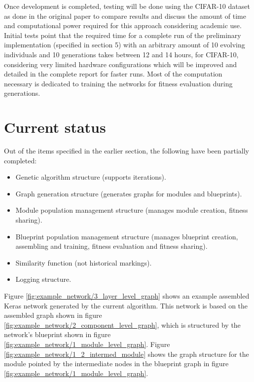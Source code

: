 \documentclass[12pt]{article}
\begin{document}
Once development is completed, testing will be done using the CIFAR-10 \cite{CIFAR-10} dataset as done in the original paper to compare results and discuss the amount of time and computational power required for this approach considering academic use. Initial tests point that the required time for a complete run of the preliminary implementation (specified in section 5) with an arbitrary amount of 10 evolving individuals and 10 generations takes between 12 and 14 hours, for CIFAR-10, considering very limited hardware configurations which will be improved and detailed in the complete report for faster runs. Most of the computation necessary is dedicated to training the networks for fitness evaluation during generations.

\section{Current status}

Out of the items specified in the earlier section, the following have been partially completed:
\begin{itemize}
        \item Genetic algorithm structure (supports iterations).
        \item Graph generation structure (generates graphs for modules and blueprints).
        \item Module population management structure (manages module creation, fitness sharing).
        \item Blueprint population management structure (manages blueprint creation, assembling and training, fitness evaluation and fitness sharing).
        \item Similarity function (not historical markings).
        \item Logging structure.
\end{itemize}

Figure \ref{fig:example_network/3_layer_level_graph} shows an example assembled Keras network generated by the current algorithm. This network is based on the assembled graph shown in figure \ref{fig:example_network/2_component_level_graph}, which is structured by the network's blueprint shown in figure \ref{fig:example_network/1_module_level_graph}. Figure \ref{fig:example_network/1_2_intermed_module} shows the graph structure for the module pointed by the intermediate nodes in the blueprint graph in figure \ref{fig:example_network/1_module_level_graph}.
\end{document}
